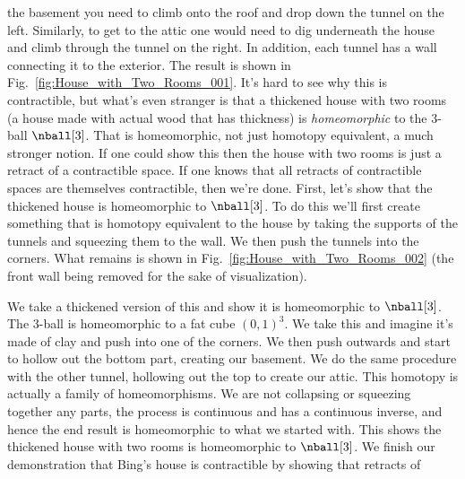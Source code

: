 \documentclass{book}                                                           %
\begin{document}
                the basement you need to climb onto the roof and drop down the
                tunnel on the left. Similarly, to get to the attic one would
                need to dig underneath the house and climb through the tunnel on
                the right. In addition, each tunnel has a wall connecting it to
                the exterior. The result is shown in
                Fig.~\ref{fig:House_with_Two_Rooms_001}. It's hard to see why
                this is contractible, but what's even stranger is that a
                thickened house with two rooms (a house made with actual wood
                that has thickness) is \textit{homeomorphic} to the 3-ball
                $\nball[3]$. That is homeomorphic, not just homotopy equivalent,
                a much stronger notion. If one could show this then the house
                with two rooms is just a retract of a contractible space. If one
                knows that all retracts of contractible spaces are themselves
                contractible, then we're done. First, let's show that the
                thickened house is homeomorphic to $\nball[3]$. To do this we'll
                first create something that is homotopy equivalent to the house
                by taking the supports of the tunnels and squeezing them to the
                wall. We then push the tunnels into the corners. What remains is
                shown in Fig.~\ref{fig:House_with_Two_Rooms_002} (the front
                wall being removed for the sake of visualization).
                \par\hfill\par
                We take a thickened version of this and show it is homeomorphic
                to $\nball[3]$. The 3-ball is homeomorphic to a fat cube
                $(0,1)^{3}$. We take this and imagine it's made of clay and push
                into one of the corners. We then push outwards and start to
                hollow out the bottom part, creating our basement. We do the
                same procedure with the other tunnel, hollowing out the top to
                create our attic. This homotopy is actually a family of
                homeomorphisms. We are not collapsing or squeezing together any
                parts, the process is continuous and has a continuous inverse,
                and hence the end result is homeomorphic to what we started
                with. This shows the thickened house with two rooms is
                homeomorphic to $\nball[3]$. We finish our demonstration that
                Bing's house is contractible by showing that retracts of
\end{document}
